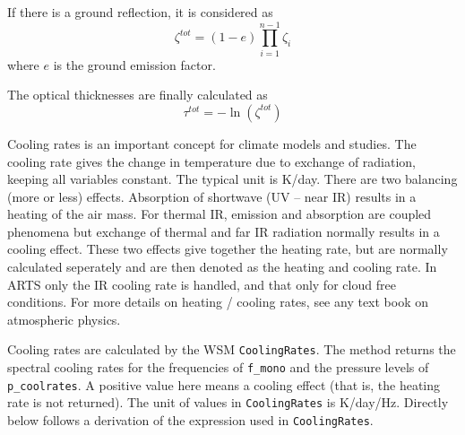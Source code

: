  If there is a ground reflection, it is considered as
 \begin{equation}
   \zeta^{tot} = (1-e)\prod_{i=1}^{n-1}\zeta_{i}
  \label{eq:rte:tground}
 \end{equation} 
 where $e$ is the ground emission factor. 

 The optical thicknesses are finally calculated as
 \begin{equation}
   \tau^{tot} = -\ln(\zeta^{tot})
  \label{eq:rte:odepth}
 \end{equation} 



 \label{sec:rte:coolrates}
 
 Cooling rates is an important concept for climate models and studies.
 The cooling rate gives the change in temperature due to exchange of
 radiation, keeping all variables constant. The typical unit is K/day.
 There are two balancing (more or less) effects. Absorption of
 shortwave (UV -- near IR) results in a heating of the air mass. For
 thermal IR, emission and absorption are coupled phenomena but
 exchange of thermal and far IR radiation normally results in a
 cooling effect. These two effects give together the heating rate, but
 are normally calculated seperately and are then denoted as the
 heating and cooling rate. In ARTS only the IR cooling rate is
 handled, and that only for cloud free conditions. For more details on
 heating / cooling rates, see any text book on atmospheric physics.
 
 Cooling rates are calculated by the WSM \verb|CoolingRates|. The
 method returns the spectral cooling rates for the frequencies of
 \verb|f_mono| and the pressure levels of \verb|p_coolrates|. A
 positive value here means a cooling effect (that is, the heating rate
 is not returned). The unit of values in \verb|CoolingRates| is
 K/day/Hz. Directly below follows a derivation of the expression used
 in \verb|CoolingRates|.
 
\newcommand{ \pressure}       {\ensuremath{P}}
\newcommand{ \temperature}    {\ensuremath{T}}
\newcommand{ \altitude}       {\ensuremath{z}}
\newcommand{ \timesymbol}     {\ensuremath{t}}
\newcommand{ \density}        {\ensuremath{\rho}}
\newcommand{ \heatcapacity}   {\ensuremath{c_\pressure}}

\newcommand{ \flux}           {\ensuremath{F}}
\newcommand{ \monoflux}       {\ensuremath{F_\f}}
\newcommand{ \odepth}         {\ensuremath{\tau}}
\newcommand{ \planckfunc}     {\ensuremath{B_\f}}
\newcommand{ \abscoeff}       {\ensuremath{\alpha}}

